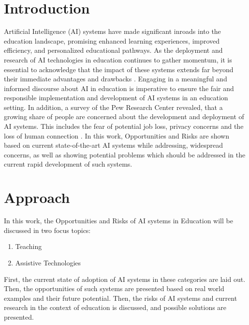 \documentclass{Academic}
\begin{document}
    \myabstract{}
    \renewcommand{\myTitle}{A Survey of Opportunities and Risks of AI Systems in Education}
    \renewcommand{\MyAuthor}{Leon Knorr}
    \renewcommand{\MyDepartment}{Mannheim Master of Datascience}
    \renewcommand{\ID}{1902854}
    \renewcommand{\Keywords}{Education, AI}
    \maketitle


    \section{Introduction}
    Artificial Intelligence (AI) systems have made significant inroads into the education landscape, promising enhanced learning experiences, improved efficiency, and personalized educational pathways. As the deployment and research of AI technologies in education continues to gather momentum, it is essential to acknowledge that the impact of these systems extends far beyond their immediate advantages and drawbacks \cite{chen_ai_2023}. Engaging in a meaningful and informed discourse about AI in education is imperative to ensure the fair and responsible implementation and development of AI systems in an education setting. In addition, a survey of the Pew Research Center revealed, that a growing share of people are concerned about the development and deployment of AI systems. This includes the fear of potential job loss, privacy concerns and the loss of human connection \cite{nadeem_1_2022}. In this work, Opportunities and Risks are shown based on current state-of-the-art AI systems while addressing, widespread concerns, as well as showing potential problems which should be addressed in the current rapid development of such systems.
    
    \section{Approach}
    In this work, the Opportunities and Risks of AI systems in Education will be discussed in two focus topics:
    \begin{enumerate}
        \item Teaching
        \item Assistive Technologies
    \end{enumerate}
    First, the current state of adoption of AI systems in these categories are laid out. Then, the opportunities of such systems are presented based on real world examples and their future potential. Then, the risks of AI systems and current research in the context of education is discussed, and possible solutions are presented.
    
\end{document}
